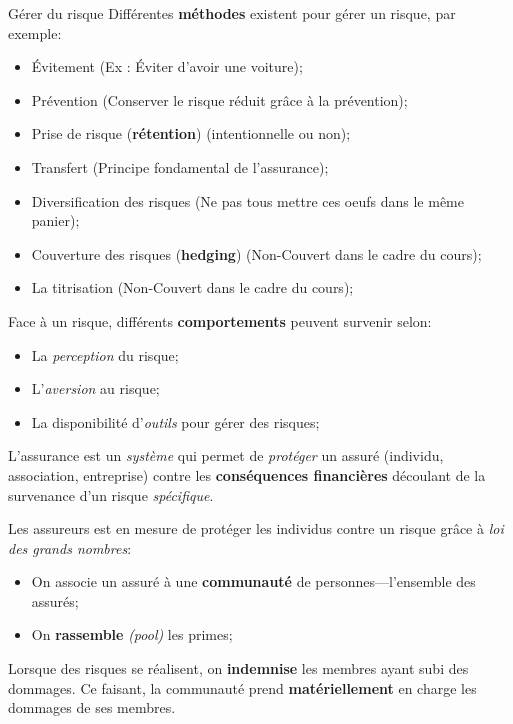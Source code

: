 \documentclass[10pt, french]{article}
\begin{document}
\begin{multicols*}{3}
\begin{algo}{Gérer du risque}
Différentes \textbf{méthodes} existent pour gérer un risque, par exemple:
\begin{itemize}[leftmargin = *]
	\item	Évitement (Ex : Éviter d'avoir une voiture);
	\item	Prévention (Conserver le risque réduit grâce à la prévention);
	\item	Prise de risque (\textbf{rétention}) (intentionnelle ou non);
	\item	Transfert (Principe fondamental de l'assurance);
	\item	Diversification des risques (Ne pas tous mettre ces oeufs dans le même panier);
	\item	\textcolor{amaranth}{Couverture des risques (\textbf{hedging}) (Non-Couvert dans le cadre du cours)};
	\item	\textcolor{amaranth}{La titrisation (Non-Couvert dans le cadre du cours)};
\end{itemize}
%
Face à un risque, différents \textbf{comportements} peuvent survenir selon:
\begin{itemize}
	\item	La \textit{perception} du risque;
	\item	L'\textit{aversion} au risque;
	\item	La disponibilité d'\textit{outils} pour gérer des risques;
\end{itemize}
\end{algo}

\begin{definitionNOHFILL}[L'assurance]
L'assurance est un \textit{système} qui permet de \textit{protéger} un assuré (individu, association, entreprise) contre les \textbf{conséquences \textbf{financières}} découlant de la survenance d'un risque \textit{spécifique}.

Les assureurs est en mesure de protéger les individus contre un risque grâce à \textit{loi des grands nombres}:
\begin{itemize}
	\item	On associe un assuré à une \textbf{communauté} de personnes---l'ensemble des assurés;
	\item	On \textbf{rassemble} \textit{(pool)} les primes; 
\end{itemize}
Lorsque des risques se réalisent, on \textbf{indemnise} les membres ayant subi des dommages. Ce faisant, la communauté prend \textbf{matériellement} en charge les dommages de ses membres.


\end{definitionNOHFILL}
\end{multicols*}
\end{document}
